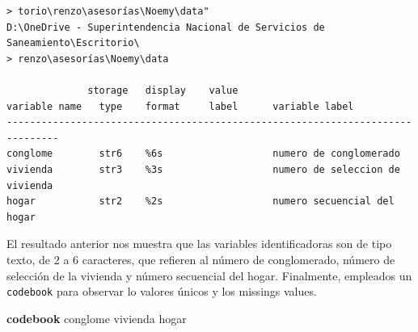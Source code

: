 \documentclass[
]{book}
\newenvironment{Shaded}{\begin{snugshade}}{\end{snugshade}}
\newcommand{\KeywordTok}[1]{\textcolor[rgb]{0.13,0.29,0.53}{\textbf{#1}}}
\newcommand{\NormalTok}[1]{#1}
\theoremstyle{definition}
\theoremstyle{definition}
\theoremstyle{definition}
\theoremstyle{definition}
\theoremstyle{remark}
\begin{document}
\begin{verbatim}
> torio\renzo\asesorías\Noemy\data"
D:\OneDrive - Superintendencia Nacional de Servicios de Saneamiento\Escritorio\
> renzo\asesorías\Noemy\data

              storage   display    value
variable name   type    format     label      variable label
-------------------------------------------------------------------------------
conglome        str6    %6s                   numero de conglomerado
vivienda        str3    %3s                   numero de seleccion de vivienda
hogar           str2    %2s                   numero secuencial del hogar
\end{verbatim}

El resultado anterior nos muestra que las variables identificadoras son de tipo texto, de 2 a 6 caracteres, que refieren al número de conglomerado, número de selección de la vivienda y número secuencial del hogar. Finalmente, empleados un \texttt{codebook} para observar lo valores únicos y los missings values.

\begin{Shaded}
\begin{Highlighting}[]
\KeywordTok{codebook}\NormalTok{ conglome vivienda hogar}
\end{Highlighting}
\end{Shaded}
\end{document}
